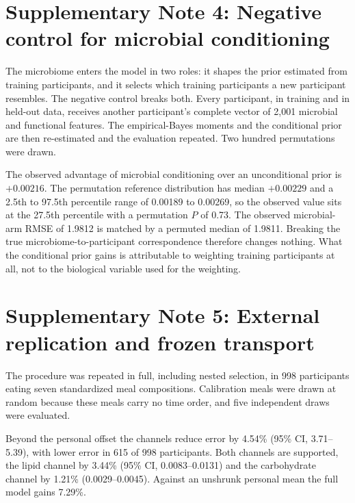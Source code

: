 \documentclass[10pt]{article}
\begin{document}

\clearpage

\section*{Supplementary Note 4: Negative control for microbial conditioning}

The microbiome enters the model in two roles: it shapes the prior estimated from training
participants, and it selects which training participants a new participant resembles. The negative
control breaks both. Every participant, in training and in held-out data, receives another
participant's complete vector of 2{,}001 microbial and functional features. The empirical-Bayes
moments and the conditional prior are then re-estimated and the evaluation repeated. Two hundred
permutations were drawn.

The observed advantage of microbial conditioning over an unconditional prior is $+0.00216$. The
permutation reference distribution has median $+0.00229$ and a 2.5th to 97.5th percentile range of
0.00189 to 0.00269, so the observed value sits at the 27.5th percentile with a permutation
$P$ of 0.73. The observed microbial-arm RMSE of 1.9812 is matched by a permuted median of 1.9811.
Breaking the true microbiome-to-participant correspondence therefore changes nothing. What the
conditional prior gains is attributable to weighting training participants at all, not to the
biological variable used for the weighting.


\clearpage

\section*{Supplementary Note 5: External replication and frozen transport}

The procedure was repeated in full, including nested selection, in 998 participants eating seven
standardized meal compositions. Calibration meals were drawn at random because these meals carry
no time order, and five independent draws were evaluated.

Beyond the personal offset the channels reduce error by 4.54\% (95\% CI, 3.71--5.39), with lower
error in 615 of 998 participants. Both channels are supported, the lipid channel by 3.44\%
(95\% CI, 0.0083--0.0131) and the carbohydrate channel by 1.21\% (0.0029--0.0045). Against an
unshrunk personal mean the full model gains 7.29\%.
\end{document}
